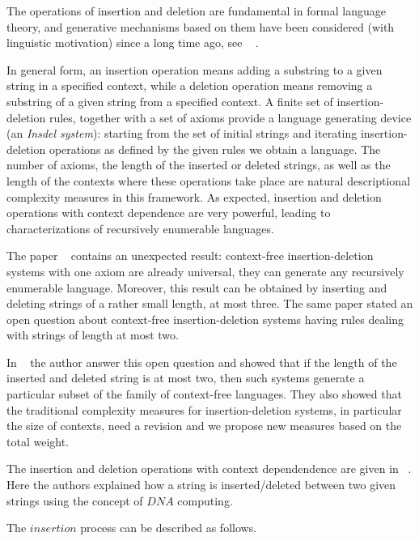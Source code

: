 
The operations of insertion and deletion are fundamental in formal language theory,
and generative mechanisms based on them have been considered (with linguistic motivation)
 since a long time ago, see ~\cite{marcus} . 

In general form, an insertion operation means adding a substring to a given string
in a specified context, while a deletion operation means removing a substring of a
given string from a specified context. A finite set of insertion-deletion rules, together
with a set of axioms provide a language generating device (an \emph{Insdel system}): starting 
from the set of initial strings and iterating insertion-deletion operations as defined
by the given rules we obtain a language. The number of axioms, the length of the
inserted or deleted strings, as well as the length of the contexts where these operations
take place are natural descriptional complexity measures in this framework. As expected, 
insertion and deletion operations with context dependence are very powerful,
leading to characterizations of recursively enumerable languages. 


The paper ~\cite{margentern} contains an unexpected result: context-free insertion-deletion systems
with one axiom are already universal, they can generate any recursively enumerable
language. Moreover, this result can be obtained by inserting and deleting strings of
a rather small length, at most three. The same paper stated an open question about
context-free insertion-deletion systems having rules dealing with strings of length at
most two.

In ~\cite{verlan} the author answer this open question and showed that if the length of the
inserted and deleted string is at most two, then such systems generate a particular
subset of the family of context-free languages. They also showed that the traditional
complexity measures for insertion-deletion systems, in particular the size of contexts,
need a revision and we propose new measures based on the total weight.

The insertion and deletion operations with context dependendence are given in ~\cite{paun}. Here the authors 
explained how a string is inserted/deleted between two given strings using the concept of $DNA$ computing.

The $insertion$ process can be described as follows.

